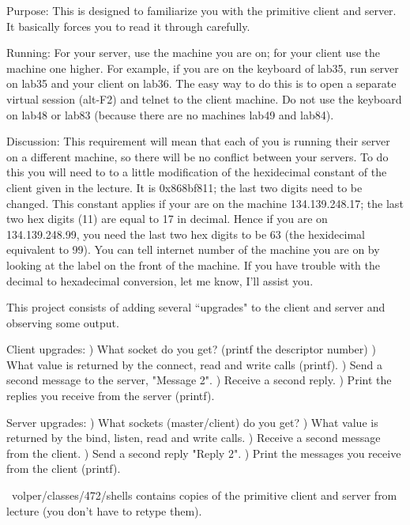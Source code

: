 

\parindent 0pt

Purpose: This is designed to familiarize you with the primitive client
and server. It basically forces you to read it through carefully.

Running: For your server, use the machine you are on;
for your client use the machine one higher.
For example, if you are on the keyboard of lab35, run server on
lab35 and your client on lab36.
The easy way to do this is to open a separate virtual session
(alt-F2) and telnet to the client machine.
Do not use the keyboard on lab48 or lab83 (because there are no
machines lab49 and lab84).

Discussion: This requirement will mean that each of you is running
their server on a different machine, so there will be no conflict
between your servers.
To do this you will need to to a little modification of the
hexidecimal constant of the client given in the lecture.
It is 0x868bf811; the last two digits need to be changed.
This constant applies if your are on the machine 134.139.248.17;
the last two hex digits (11) are equal to 17 in decimal.
Hence if you are on 134.139.248.99, you need the last two hex digits
to be 63 (the hexidecimal equivalent to 99).
You can tell internet number of the machine you are on by looking at the label
on the front of the machine.
If you have trouble with the decimal to hexadecimal conversion, let me
know, I'll assist you.

This project consists of adding several ``upgrades" to the client and
server and observing some output.

Client upgrades:
\hfill{}) What socket do you get? (printf the descriptor number)
\hfill{}) What value is returned by the connect, read and write calls (printf).
\hfill{}) Send a second message to the server, {\ltt{}"Message 2"}.
\hfill{}) Receive a second reply.
\hfill{}) Print the replies you receive from the server (printf).

Server upgrades:
\hfill{}) What sockets (master/client) do you get?
\hfill{}) What value is returned by the bind, listen, read and write calls.
\hfill{}) Receive a second message from the client.
\hfill{}) Send a second reply {\ltt{}"Reply 2"}.
\hfill{}) Print the messages you receive from the client (printf).

{\ltt{}~volper/classes/472/shells} contains copies
of the primitive client and server from lecture
(you don't have to retype them).
\bye
